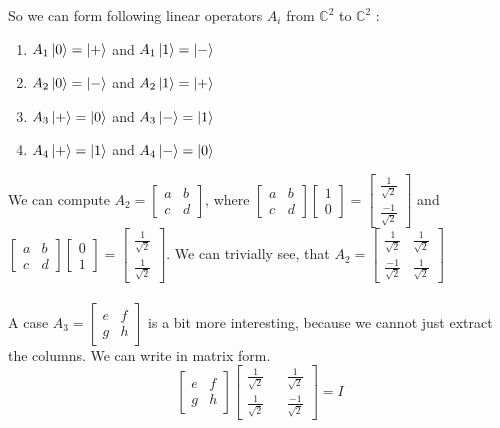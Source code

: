 \documentclass{article}
\begin{document}
\begin{framed}
    So we can form following linear operators $A_i$ from $\mathbb{C}^{2}$ to $\mathbb{C}^{2}$ :
    \begin{enumerate}
        \item $A_1\ket{0} = \ket{+}$ and $A_1\ket{1} = \ket{-}$
        \item $A_2\ket{0} = \ket{-}$ and $A_2\ket{1} = \ket{+}$
        \item $A_3\ket{+} = \ket{0}$ and $A_3\ket{-} = \ket{1}$
        \item $A_4\ket{+} = \ket{1}$ and $A_4\ket{-} = \ket{0}$
    \end{enumerate}
    We can compute $A_2 = \begin{bmatrix} a & b \\ c & d \end{bmatrix}$, where $ \begin{bmatrix} a & b \\ c & d \end{bmatrix} \begin{bmatrix} 1 \\ 0 \end{bmatrix} = \begin{bmatrix} \frac{1}{\sqrt{2}} \\ \frac{-1}{\sqrt{2}} \end{bmatrix}$ and $ \begin{bmatrix} a & b \\ c & d \end{bmatrix} \begin{bmatrix} 0 \\ 1 \end{bmatrix} = \begin{bmatrix} \frac{1}{\sqrt{2}} \\ \frac{1}{\sqrt{2}} \end{bmatrix}$. We can trivially see, that $A_2 = \begin{bmatrix} \frac{1}{\sqrt{2}} & \frac{1}{\sqrt{2}} \\ \frac{-1}{\sqrt{2}} & \frac{1}{\sqrt{2}} \end{bmatrix}$ \\ \\ 
    A case $A_3 = \begin{bmatrix} e & f \\ g & h \end{bmatrix}$ is a bit more interesting, because we cannot just extract the columns. We can write in matrix form.
    $$
    \begin{bmatrix} e & f \\ g & h \end{bmatrix} \begin{bmatrix} \frac{1}{\sqrt{2}} && \frac{1}{\sqrt{2}} \\ \frac{1}{\sqrt{2}} && \frac{-1}{\sqrt{2}} \end{bmatrix} = I
$$
\end{framed}
\end{document}
